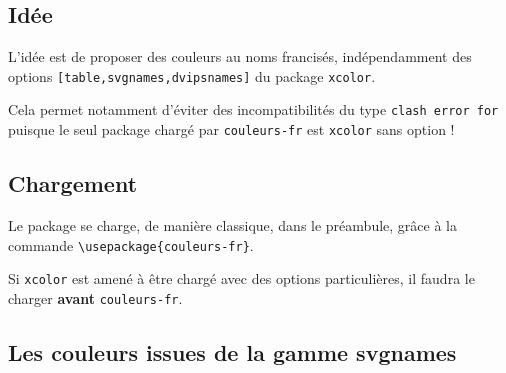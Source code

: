 \documentclass{article}
\begin{document}
\subsection{Idée}

L'idée est de proposer des couleurs au noms francisés, indépendamment des options \texttt{[table,svgnames,dvipsnames]} du package \texttt{xcolor}.

Cela permet notamment d'éviter des incompatibilités du type \texttt{clash error for} puisque le seul package chargé par \texttt{couleurs-fr} est \texttt{xcolor} sans option !

\subsection{Chargement}

Le package se charge, de manière classique, dans le préambule, grâce à la commande \verb+\usepackage{couleurs-fr}+.

Si \texttt{xcolor} est amené à être chargé avec des options particulières, il faudra le charger \textbf{avant} \texttt{couleurs-fr}.

\pagebreak

\subsection{Les couleurs issues de la gamme \og svgnames \fg}
\end{document}
